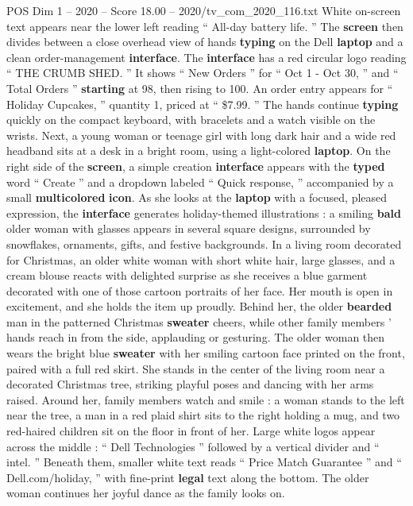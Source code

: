 \begin{textsample}{POS Dim 1 – 2020 – Score 18.00 – 2020/tv\_com\_2020\_116.txt}
White on-screen text appears near the lower left reading “ All-day battery life. ” The \textbf{screen} then divides between a close overhead view of hands \textbf{typing} on the Dell \textbf{laptop} and a clean order-management \textbf{interface}.
The \textbf{interface} has a red circular logo reading “ THE CRUMB SHED. ” It shows “ New Orders ” for “ Oct 1 - Oct 30, ” and “ Total Orders ” \textbf{starting} at 98, then rising to 100.
An order entry appears for “ Holiday Cupcakes, ” quantity 1, priced at “ \$7.99. ” The hands continue \textbf{typing} quickly on the compact keyboard, with bracelets and a watch visible on the wrists.
Next, a young woman or teenage girl with long dark hair and a wide red headband sits at a desk in a bright room, using a light-colored \textbf{laptop}.
On the right side of the \textbf{screen}, a simple creation \textbf{interface} appears with the \textbf{typed} word “ Create ” and a dropdown labeled “ Quick response, ” accompanied by a small \textbf{multicolored} \textbf{icon}.
As she looks at the \textbf{laptop} with a focused, pleased expression, the \textbf{interface} generates holiday-themed illustrations : a smiling \textbf{bald} older woman with glasses appears in several square designs, surrounded by snowflakes, ornaments, gifts, and festive backgrounds.
In a living room decorated for Christmas, an older white woman with short white hair, large glasses, and a cream blouse reacts with delighted surprise as she receives a blue garment decorated with one of those cartoon portraits of her face.
Her mouth is open in excitement, and she holds the item up proudly.
Behind her, the older \textbf{bearded} man in the patterned Christmas \textbf{sweater} cheers, while other family members ’ hands reach in from the side, applauding or gesturing.
The older woman then wears the bright blue \textbf{sweater} with her smiling cartoon face printed on the front, paired with a full red skirt.
She stands in the center of the living room near a decorated Christmas tree, striking playful poses and dancing with her arms raised.
Around her, family members watch and smile : a woman stands to the left near the tree, a man in a red plaid shirt sits to the right holding a mug, and two red-haired children sit on the floor in front of her.
Large white logos appear across the middle : “ Dell Technologies ” followed by a vertical divider and “ intel. ” Beneath them, smaller white text reads “ Price Match Guarantee ” and “ Dell.com/holiday, ” with fine-print \textbf{legal} text along the bottom.
The older woman continues her joyful dance as the family looks on.

\end{textsample}
